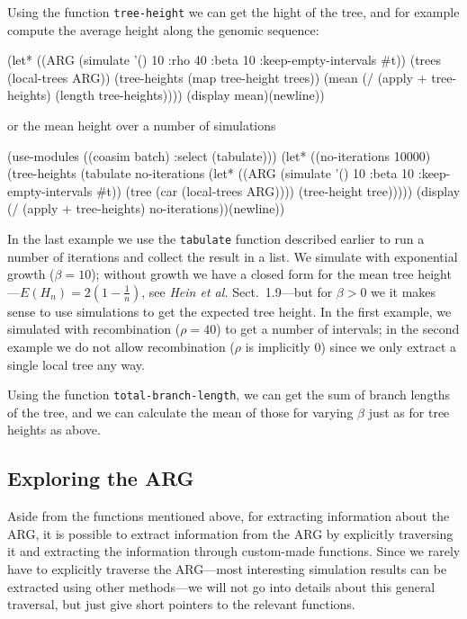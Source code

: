 \documentclass{manual}
\begin{document}
\begin{empfile}
Using the function \texttt{tree-height} we can get the hight of the
tree, and for example compute the average height along the genomic
sequence:
\begin{code}
(let* ((ARG (simulate '() 10 :rho 40 :beta 10 :keep-empty-intervals #t))
       (trees (local-trees ARG))
       (tree-heights (map tree-height trees))
       (mean (/ (apply + tree-heights) (length tree-heights))))
  (display mean)(newline))
\end{code}
or the mean height over a number of simulations
\begin{code}
(use-modules ((coasim batch) :select (tabulate)))
(let* ((no-iterations 10000)
       (tree-heights
        (tabulate no-iterations
                  (let* ((ARG (simulate '() 10
                                        :beta 10
                                        :keep-empty-intervals #t))
                         (tree (car (local-trees ARG))))
                    (tree-height tree)))))
  (display (/ (apply + tree-heights) no-iterations))(newline))
\end{code}

In the last example we use the \texttt{tabulate} function described
earlier to run a number of iterations and collect the result in a
list.  We simulate with exponential growth ($\beta=10$); without
growth we have a closed form for the mean tree
height---$E(H_n)=2\left(1-\frac{1}{n}\right)$, see \emph{Hein et al.}
Sect.~1.9---but for $\beta>0$ we it makes sense to use simulations to
get the expected tree height.  In the first example, we simulated with
recombination ($\rho=40$) to get a number of intervals; in the second
example we do not allow recombination ($\rho$ is implicitly $0$) since
we only extract a single local tree any way.

Using the function \texttt{total-branch-length}, we can get the sum of
branch lengths of the tree, and we can calculate the mean of those for
varying $\beta$ just as for tree heights as above.


\subsection{Exploring the ARG}
\label{sec:exploring-arg}

Aside from the functions mentioned above, for extracting information
about the ARG, it is possible to extract information from the ARG by
explicitly traversing it and extracting the information through
custom-made functions.  Since we rarely have to explicitly traverse
the ARG---most interesting simulation results can be extracted using
other methods---we will not go into details about this general
traversal, but just give short pointers to the relevant functions.


\end{empfile}
\end{document}
